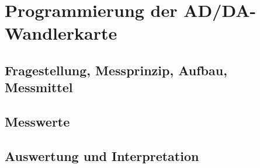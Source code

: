 %
%
\chapter{Programmierung der AD/DA-Wandlerkarte}
\label{chap:VERSUCH_1}
 
\section{Fragestellung, Messprinzip, Aufbau, Messmittel}
\label{chap:VERSUCH_1_FRAGESTELLUNG}
\section{Messwerte}
\label{chap:VERSUCH_1_MESSWERTE}

\section{Auswertung und Interpretation}
\label{chap:VERSUCH_1_AUSWERTUNG}
